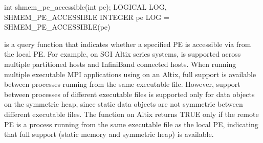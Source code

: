 \synC     
int shmem_pe_accessible(int pe);
\synF
LOGICAL LOG, SHMEM_PE_ACCESSIBLE
INTEGER pe
LOG = SHMEM_PE_ACCESSIBLE(pe)

{
        is  a  query function  that indicates  whether  a
       specified PE is accessible via \openshmem from the local PE. For example, on  SGI	Altix  series  systems, \openshmem	is  supported  across multiple
       partitioned hosts and InfiniBand connected hosts. When running multiple executable MPI applications using \openshmem on an Altix,
       full \openshmem support is available between processes running from the same
       executable file. However, \openshmem support between processes of different
       executable  files  is  supported only for data objects on the symmetric
       heap, since static data objects are  not symmetric  between  different
       executable  files. The  function on Altix returns
       TRUE only if  the  remote  \ac{PE}  is  a  process  running  from  the  same
       executable  file	 as  the  local \ac{PE}, indicating that full \openshmem support
       (static memory and symmetric heap) is available.
}
{

\notesB{}
}

\eAPI